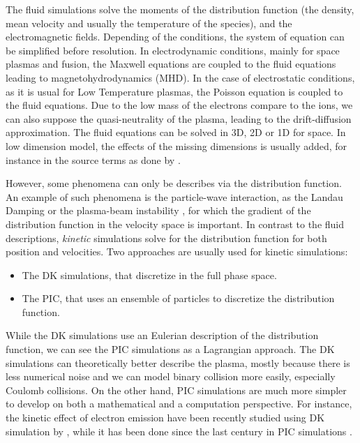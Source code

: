 The fluid simulations solve the moments of the distribution function (the density, mean velocity and usually the temperature of the species), and the electromagnetic fields.
Depending of the conditions, the system of equation can be simplified before resolution.
In electrodynamic conditions, mainly for space plasmas and fusion, the Maxwell equations are coupled to the fluid equations leading to magnetohydrodynamics (MHD).
In the case of electrostatic conditions, as it is usual for Low Temperature plasmas, the Poisson equation is coupled to the fluid equations.
Due to the low mass of the electrons compare to the ions, we can also suppose the quasi-neutrality of the plasma, leading to the drift-diffusion approximation.
The fluid equations can be solved in \ac{3D}, \ac{2D} or \ac{1D} for space.
In low dimension model, the effects of the missing dimensions is usually added, for instance in the source terms as done by \citet{barral2003a}.

\vspace{1em}
However, some phenomena can only be describes via the distribution function.
An example of such phenomena is the particle-wave interaction, as the Landau Damping \citep{landau1945,malmberg1964} or the plasma-beam instability \citep{filippychev1990}, for which the gradient of the distribution function in the velocity space is important.
In contrast to the fluid descriptions, \emph{kinetic} simulations solve for the distribution function for both position and velocities.
Two approaches are usually used for kinetic simulations\string:
\begin{itemize}
  \item The \ac{DK} simulations, that discretize  in the full phase space.
  \item The \ac{PIC}, that uses an ensemble of particles to discretize the distribution function.
\end{itemize} 
While the \ac{DK} simulations use an Eulerian description of the distribution function, we can see the \ac{PIC} simulations as a Lagrangian approach.
The \ac{DK} simulations can theoretically better describe the plasma, mostly because there is less numerical noise and we can model binary collision more easily, especially Coulomb collisions.
On the other hand, \ac{PIC} simulations are much more simpler to develop on both a mathematical and a computation perspective.
For instance, the kinetic effect of electron emission have been recently studied using \ac{DK} simulation by \citet{cagas2019}, while it has been done since the last century in \ac{PIC} simulations \citep{boswell1988}.


